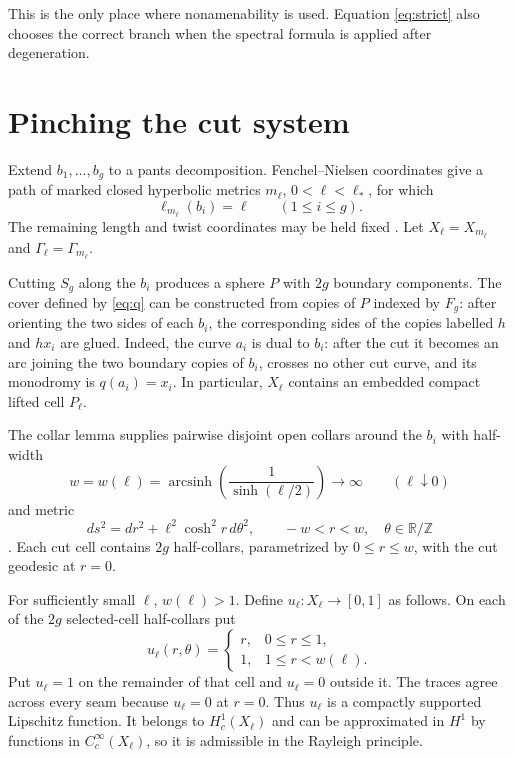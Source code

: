 \documentclass[11pt]{article}
\theoremstyle{definition}
\begin{document}
This is the only place where nonamenability is used.  Equation
\eqref{eq:strict} also chooses the correct branch when the spectral formula is
applied after degeneration.

\section{Pinching the cut system}

Extend $b_1,\ldots,b_g$ to a pants decomposition.  Fenchel--Nielsen
coordinates give a path of marked closed hyperbolic metrics $m_\ell$,
$0<\ell<\ell_*$, for which
\[
 \ell_{m_\ell}(b_i)=\ell\qquad(1\le i\le g).
\]
The remaining length and twist coordinates may be held fixed
\citep{Buser1992}.  Let
$X_\ell=X_{m_\ell}$ and $\Gamma_\ell=\Gamma_{m_\ell}$.

Cutting $S_g$ along the $b_i$ produces a sphere $P$ with $2g$ boundary
components.  The cover defined by \eqref{eq:q} can be constructed from copies
of $P$ indexed by $F_g$: after orienting the two sides of each $b_i$, the
corresponding sides of the copies labelled $h$ and $hx_i$ are glued.  Indeed,
the curve $a_i$ is dual to $b_i$: after the cut it becomes an arc joining the
two boundary copies of $b_i$, crosses no other cut curve, and its monodromy is
$q(a_i)=x_i$.  In
particular, $X_\ell$ contains an embedded compact lifted cell $P_\ell$.

The collar lemma supplies pairwise disjoint open collars around the $b_i$ with
half-width
\begin{equation}\label{eq:w}
 w=w(\ell)=\operatorname{arcsinh}\!\left(
 \frac{1}{\sinh(\ell/2)}\right)
 \longrightarrow\infty
 \qquad(\ell\downarrow0)
\end{equation}
and metric
\begin{equation}\label{eq:collar-metric}
 ds^2=dr^2+\ell^2\cosh^2r\,d\theta^2,
 \qquad -w<r<w,\quad \theta\in\mathbb R/\mathbb Z
\end{equation}
\citep{Keen1974,Buser1992}.  Each cut cell contains $2g$ half-collars,
parametrized by $0\le r\le w$, with the cut geodesic at $r=0$.

For sufficiently small $\ell$, $w(\ell)>1$.  Define
$u_\ell:X_\ell\to[0,1]$ as follows.  On each of the $2g$ selected-cell
half-collars put
\[
 u_\ell(r,\theta)=
 \begin{cases}
  r,&0\le r\le1,\\
  1,&1\le r<w(\ell).
 \end{cases}
\]
Put $u_\ell=1$ on the remainder of that cell and $u_\ell=0$ outside it.  The
traces agree across every seam because $u_\ell=0$ at $r=0$.  Thus $u_\ell$ is
a compactly supported Lipschitz
function.  It belongs to $H^1_c(X_\ell)$ and can be approximated in $H^1$ by
functions in $C_c^\infty(X_\ell)$, so it is admissible in the Rayleigh
principle.
\end{document}
